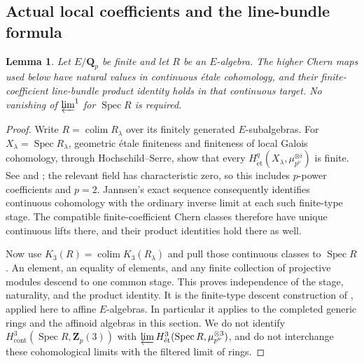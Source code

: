 \documentclass[11pt,a4paper]{amsart}
\numberwithin{equation}{section}
\newtheorem{lemma}[theorem]{Lemma}
\theoremstyle{definition}
\theoremstyle{remark}
\newcommand{\Q}{\mathbf Q}
\newcommand{\Z}{\mathbf Z}
\newcommand{\Spec}{\operatorname{Spec}}
\newcommand{\colim}{\operatorname*{colim}}
\begin{document}
\subsection{Actual local coefficients and the line-bundle formula}

\begin{lemma}\label{d3:lem:continuouschern}
Let $E/\Q_p$ be finite and let $R$ be an $E$-algebra. The higher Chern maps used below have natural values in continuous \'etale cohomology, and their finite-coefficient line-bundle product identity holds in that continuous target. No vanishing of $\varprojlim^1$ for $\Spec R$ is required.
\end{lemma}
\begin{proof}
Write $R=\colim R_\lambda$ over its finitely generated $E$-subalgebras. For $X_\lambda=\Spec R_\lambda$, geometric \'etale finiteness and finiteness of local Galois cohomology, through Hochschild--Serre, show that every
$H^q_{\mathrm{\acute et}}(X_\lambda,\mu_{p^\nu}^{\otimes i})$ is finite. See \cite[Theorem~19.1(b)]{MilneEtale} and \cite[Chapter~I, Corollary~2.3]{MilneDuality}; the relevant field has characteristic zero, so this includes $p$-power coefficients and $p=2$. Jannsen's exact sequence \cite[equation~(0.2)]{Jannsen} consequently identifies continuous cohomology with the ordinary inverse limit at each such finite-type stage. The compatible finite-coefficient Chern classes therefore have unique continuous lifts there, and their product identities hold there as well.

Now use $K_3(R)=\colim K_3(R_\lambda)$ and pull those continuous classes to $\Spec R$. An element, an equality of elements, and any finite collection of projective modules descend to one common stage. This proves independence of the stage, naturality, and the product identity. It is the finite-type descent construction of \cite[Section~5.1]{LevineIndK3}, applied here to affine $E$-algebras. In particular it applies to the completed generic rings and the affinoid algebras in this section. We do not identify $H^3_{\mathrm{cont}}(\Spec R,\Z_p(3))$ with $\varprojlim H^3_{\mathrm{\acute et}}(\Spec R,\mu_{p^\nu}^{\otimes3})$, and do not interchange these cohomological limits with the filtered limit of rings.
\end{proof}
\end{document}
